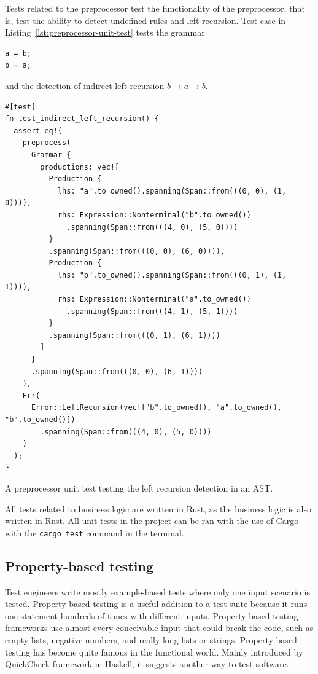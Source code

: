 \documentclass[english,bachelors,forcepolishlogotype]{wizthesis}
\begin{document}
Tests related to the preprocessor test the functionality of the preprocessor,
that is, test the ability to detect undefined rules and left recursion. Test
case in Listing~\ref{lst:preprocessor-unit-test} tests the grammar
\begin{verbatim}
a = b;
b = a;
\end{verbatim}
and the detection of indirect left recursion $b \rightarrow a \rightarrow b$.

\begin{listing}[H]
  \begin{verbatim}
#[test]
fn test_indirect_left_recursion() {
  assert_eq!(
    preprocess(
      Grammar {
        productions: vec![
          Production {
            lhs: "a".to_owned().spanning(Span::from(((0, 0), (1, 0)))),
            rhs: Expression::Nonterminal("b".to_owned())
              .spanning(Span::from(((4, 0), (5, 0))))
          }
          .spanning(Span::from(((0, 0), (6, 0)))),
          Production {
            lhs: "b".to_owned().spanning(Span::from(((0, 1), (1, 1)))),
            rhs: Expression::Nonterminal("a".to_owned())
              .spanning(Span::from(((4, 1), (5, 1))))
          }
          .spanning(Span::from(((0, 1), (6, 1))))
        ]
      }
      .spanning(Span::from(((0, 0), (6, 1))))
    ),
    Err(
      Error::LeftRecursion(vec!["b".to_owned(), "a".to_owned(), "b".to_owned()])
        .spanning(Span::from(((4, 0), (5, 0))))
    )
  );
}
  \end{verbatim}
  \caption{A preprocessor unit test testing the left recursion detection in an
  AST.}
  \label{lst:preprocessor-unit-test}
\end{listing}

All tests related to business logic are written in Rust, as the business logic
is also written in Rust. All unit tests in the project can be ran with the use
of Cargo with the \texttt{cargo test} command in the terminal.

\subsection{Property-based testing}

Test engineers write mostly example-based tests where only one input scenario is
tested. Property-based testing is a useful addition to a test suite because it
runs one statement hundreds of times with different inputs. Property-based
testing frameworks use almost every conceivable input that could break the
code, such as empty lists, negative numbers, and really long lists or strings.
Property based testing has become quite famous in the functional world. Mainly
introduced by QuickCheck framework in Haskell, it suggests another way to test
software.
\end{document}
